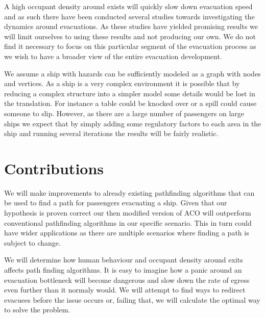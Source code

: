 A high occupant density around exists will quickly slow down evacuation speed and as such there have been conducted several studies
towards investigating the dynamics around evacuations. As these studies have yielded promising results we will
limit ourselves to using these results and not producing our own. We do not find it necessary to focus on this particular segment 
of the evacuation process as we wish to have a broader view of the entire evacuation development.

We assume a ship with hazards can be sufficiently modeled as a graph with nodes and vertices. As a ship is a very complex
environment it is possible that by reducing a complex structure into a simpler model some details would be lost in the
translation. For instance a table could be knocked over or a spill could cause someone to slip. However, as there are a large number of 
passengers on large ships we expect that by simply adding some regulatory factors to each area in the ship and running
several iterations the results will be fairly realistic.                                                           %

\section{Contributions}

 We will make improvements to already existing pathfinding algorithms that can be used to find a path 
for passengers evacuating a ship. Given that our hypothesis is proven
correct our then modified version of ACO will outperform conventional pathfinding algorithms in our 
specific scenario. This in turn could have wider applications as there are multiple scenarios
where finding a path is subject to change. 

We will determine how human behaviour and occupant density around exits affects path finding algorithms.
It is easy to imagine how a panic around an evacuation bottleneck will become dangerous and slow
down the rate of egress even further than it normaly would. We will attempt to find ways to redirect
evacuees before the issue occurs or, failing that, we will calculate the optimal way to solve the problem.   %


